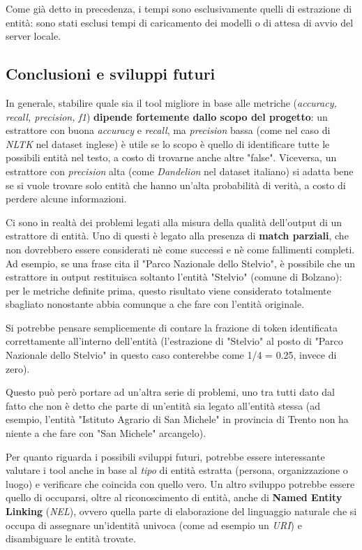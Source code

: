 \documentclass[a4paper,11pt]{article}
\begin{document}
Come già detto in precedenza, i tempi sono esclusivamente quelli di estrazione di entità: sono stati esclusi tempi di caricamento dei modelli o di attesa di avvio del server locale.

\subsection{Conclusioni e sviluppi futuri}
In generale, stabilire quale sia il tool migliore in base alle metriche (\textit{accuracy, recall, precision, f1}) \textbf{dipende fortemente dallo scopo del progetto}: un estrattore con buona \textit{accuracy} e \textit{recall}, ma \textit{precision} bassa (come nel caso di \textit{NLTK} nel dataset inglese) è utile se lo scopo è quello di identificare tutte le possibili entità nel testo, a costo di trovarne anche altre "false". Viceversa, un estrattore con \textit{precision} alta (come \textit{Dandelion} nel dataset italiano) si adatta bene se si vuole trovare solo entità che hanno un'alta probabilità di verità, a costo di perdere alcune informazioni.
\newline

Ci sono in realtà dei problemi legati alla misura della qualità dell'output di un estrattore di entità. 
Uno di questi è legato alla presenza di \textbf{match parziali}, che non dovrebbero essere considerati nè come successi e nè come fallimenti completi. Ad esempio, se una frase cita il "Parco Nazionale dello Stelvio", è possibile che un estrattore in output restituisca soltanto l'entità "Stelvio" (comune di Bolzano): per le metriche definite prima, questo risultato viene considerato totalmente sbagliato nonostante abbia comunque a che fare con l'entità originale. 

Si potrebbe pensare semplicemente di contare la frazione di token identificata correttamente all'interno dell'entità (l'estrazione di "Stelvio" al posto di "Parco Nazionale dello Stelvio" in questo caso conterebbe come 1/4 = 0.25, invece di zero). 

Questo può però portare ad un'altra serie di problemi, uno tra tutti dato dal fatto che non è detto che parte di un'entità sia legato all'entità stessa (ad esempio, l'entità "Istituto Agrario di San Michele" in provincia di Trento non ha niente a che fare con "San Michele" arcangelo).
\newline

Per quanto riguarda i possibili sviluppi futuri, potrebbe essere interessante valutare i tool anche in base al \textit{tipo} di entità estratta (persona, organizzazione o luogo) e verificare che coincida con quello vero. Un altro sviluppo potrebbe essere quello di occuparsi, oltre al riconoscimento di entità, anche di \textbf{Named Entity Linking} (\textit{NEL}), ovvero quella parte di elaborazione del linguaggio naturale che si occupa di assegnare un'identità univoca (come ad esempio un \textit{URI}) e disambiguare le entità trovate.

\clearpage


\end{document}
